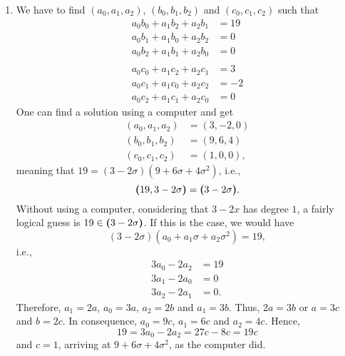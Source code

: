 \begin{solution}
    \begin{enumerate}[\rm a)]
        \item We have to find $(a_0,a_1,a_2)$, $(b_0,b_1,b_2)$ and $(c_0,c_1,c_2)$ such that
        \begin{align*}
            a_0b_0+a_1b_2+a_2b_1 &= 19\\
            a_0b_1+a_1b_0+a_2b_2 &= 0\\
            a_0b_2+a_1b_1+a_2b_0 &= 0\\\\
            a_0c_0+a_1c_2+a_2c_1 &= 3\\
            a_0c_1+a_1c_0+a_2c_2 &= -2\\
            a_0c_2+a_1c_1+a_2c_0 &= 0
        \end{align*}
        One can find a solution using a computer and get
        \begin{align*}
            (a_0,a_1,a_2) &= (3,-2,0)\\
            (b_0,b_1,b_2) &= (9,6,4)\\
            (c_0,c_1,c_2) &= (1,0,0),
        \end{align*}
        meaning that $19=(3-2\sigma)(9+6\sigma+4\sigma^2)$, i.e.,
        $$
            \textrm{\boldmath$($}19,3-2\sigma\textrm{\boldmath$)$}=\textrm{\boldmath$($}3-2\sigma\textrm{\boldmath$)$}.
        $$
        Without using a computer, considering that $3-2x$ has degree $1$, a fairly logical guess is $19\in\textrm{\boldmath$($}3-2\sigma\textrm{\boldmath$)$}$. If this is the case, we would have
        $$
            (3-2\sigma)(a_0+a_1\sigma+a_2\sigma^2)=19,
        $$
        i.e.,
        \begin{align*}
            3a_0-2a_2 &= 19\\
            3a_1-2a_0 &= 0\\
            3a_2-2a_1 &= 0.
        \end{align*}
        Therefore, $a_1=2a$, $a_0=3a$, $a_2=2b$ and $a_1=3b$. Thus, $2a=3b$ or $a=3c$ and $b=2c$. In consequence, $a_0=9c$, $a_1=6c$ and $a_2=4c$. Hence,
        $$
            19 = 3a_0 - 2a_2 = 27c-8c = 19c
        $$
        and $c=1$, arriving at $9+6\sigma+4\sigma^2$, as the computer did.


\end{enumerate}
\end{solution}
